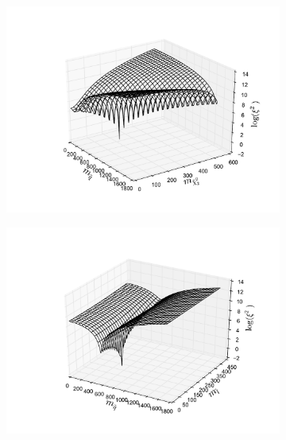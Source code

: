 \documentclass[twoside,english]{uiofysmaster}
\begin{document}
\begin{figure}[hbt]
	\centering
	\begin{subfigure}[b]{0.49\textwidth}
		\includegraphics[width=\textwidth]{figures/3D_plot_xisquared_1_simplistic_event_squark-chi2.pdf} 
		\caption{}
	\end{subfigure}
	\begin{subfigure}[b]{0.49\textwidth}
		\includegraphics[width=\textwidth]{figures/3D_plot_xisquared_1_simplistic_event_squark-slepton.pdf} 
		\caption{}
	\end{subfigure}


\end{figure}
\end{document}
